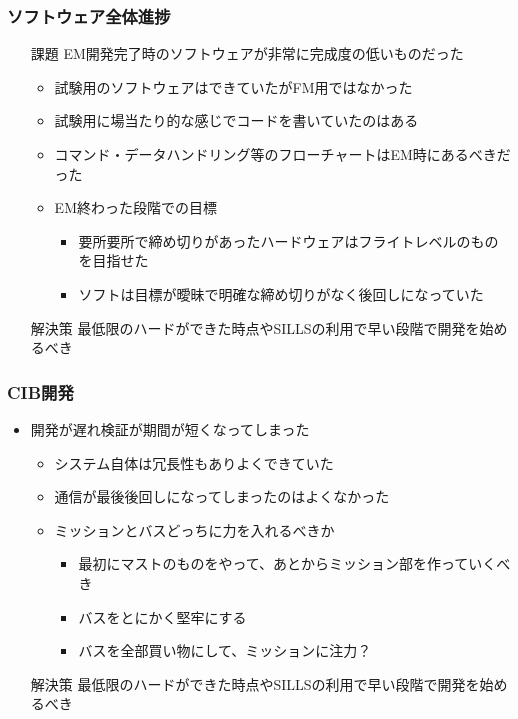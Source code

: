 \subsubsection*{ソフトウェア全体進捗}
\begin{itemize}
	\item[課題] EM開発完了時のソフトウェアが非常に完成度の低いものだった
	\begin{itemize}
		\item 試験用のソフトウェアはできていたがFM用ではなかった
		\item 試験用に場当たり的な感じでコードを書いていたのはある
		\item コマンド・データハンドリング等のフローチャートはEM時にあるべきだった
		\item EM終わった段階での目標
		\begin{itemize}
			\item 要所要所で締め切りがあったハードウェアはフライトレベルのものを目指せた
			\item ソフトは目標が曖昧で明確な締め切りがなく後回しになっていた
		\end{itemize}
	\end{itemize}
	\item[解決策] 最低限のハードができた時点やSILLSの利用で早い段階で開発を始めるべき
	
\end{itemize}

\subsubsection*{CIB開発}
\begin{itemize}
	\item 開発が遅れ検証が期間が短くなってしまった
	\begin{itemize}
		\item システム自体は冗長性もありよくできていた
		\item 通信が最後後回しになってしまったのはよくなかった
		\item ミッションとバスどっちに力を入れるべきか
		\begin{itemize}
			\item 最初にマストのものをやって、あとからミッション部を作っていくべき
			\item バスをとにかく堅牢にする
			\item バスを全部買い物にして、ミッションに注力？
		\end{itemize}
	\end{itemize}
	\item[解決策] 最低限のハードができた時点やSILLSの利用で早い段階で開発を始めるべき
\end{itemize}



